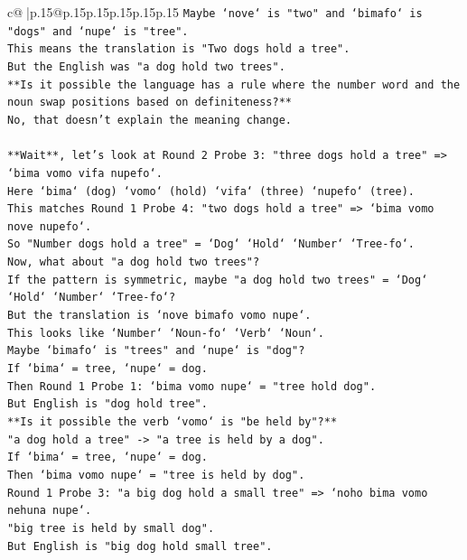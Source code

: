 \documentclass{article}
\begin{document}
{\begin{supertabular}{c@{$\;$}|p{.15\linewidth}@{}p{.15\linewidth}p{.15\linewidth}p{.15\linewidth}p{.15\linewidth}p{.15\linewidth}}
{{{\texttt{Maybe `nove` is "two" and `bimafo` is "dogs" and `nupe` is "tree".} \\
\texttt{This means the translation is "Two dogs hold a tree".} \\
\texttt{But the English was "a dog hold two trees".} \\
\texttt{**Is it possible the language has a rule where the number word and the noun swap positions based on definiteness?**} \\
\texttt{No, that doesn't explain the meaning change.} \\
\\ 
\texttt{**Wait**, let's look at Round 2 Probe 3: "three dogs hold a tree" => `bima vomo vifa nupefo`.} \\
\texttt{Here `bima` (dog) `vomo` (hold) `vifa` (three) `nupefo` (tree).} \\
\texttt{This matches Round 1 Probe 4: "two dogs hold a tree" => `bima vomo nove nupefo`.} \\
\texttt{So "Number dogs hold a tree" = `Dog` `Hold` `Number` `Tree{-}fo`.} \\
\texttt{Now, what about "a dog hold two trees"?} \\
\texttt{If the pattern is symmetric, maybe "a dog hold two trees" = `Dog` `Hold` `Number` `Tree{-}fo`?} \\
\texttt{But the translation is `nove bimafo vomo nupe`.} \\
\texttt{This looks like `Number` `Noun{-}fo` `Verb` `Noun`.} \\
\texttt{Maybe `bimafo` is "trees" and `nupe` is "dog"?} \\
\texttt{If `bima` = tree, `nupe` = dog.} \\
\texttt{Then Round 1 Probe 1: `bima vomo nupe` = "tree hold dog".} \\
\texttt{But English is "dog hold tree".} \\
\texttt{**Is it possible the verb `vomo` is "be held by"?**} \\
\texttt{"a dog hold a tree" {-}> "a tree is held by a dog".} \\
\texttt{If `bima` = tree, `nupe` = dog.} \\
\texttt{Then `bima vomo nupe` = "tree is held by dog".} \\
\texttt{Round 1 Probe 3: "a big dog hold a small tree" => `noho bima vomo nehuna nupe`.} \\
\texttt{"big tree is held by small dog".} \\
\texttt{But English is "big dog hold small tree".} \\
}}}
\end{supertabular}}
\end{document}
